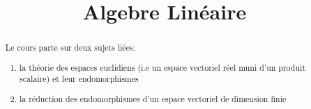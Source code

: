 \documentclass[a4paper]{report}
\title{Algebre Linéaire}
\begin{document}
\maketitle
\begin{abstract}
    Le cours parte sur deux sujets liées:
    \begin{enumerate}
        \item la théorie des espaces euclidiens (i.e un espace vectoriel réel muni d'un produit scalaire) et leur endomorphismes
        \item la réduction des endomorphismes d'un espace vectoriel de dimension finie
    \end{enumerate}
\end{abstract}


\end{document}
